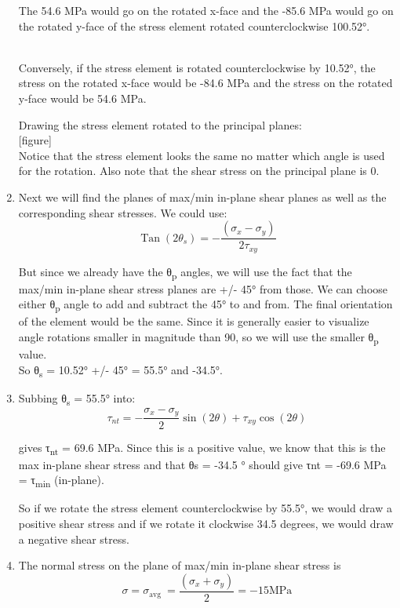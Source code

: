 \documentclass[
  letterpaper,
  DIV=11,
  numbers=noendperiod]{scrreprt}
\begin{document}
\begin{tcolorbox}
\begin{tcolorbox}
\begin{enumerate}
  The 54.6 MPa would go on the rotated x-face and the -85.6 MPa would go
  on the rotated y-face of the stress element rotated counterclockwise
  100.52°.\\
  \strut \\
  Conversely, if the stress element is rotated counterclockwise by
  10.52°, the stress on the rotated x-face would be -84.6 MPa and the
  stress on the rotated y-face would be 54.6 MPa.

  Drawing the stress element rotated to the principal planes:\\
  {[}figure{]}\\
  Notice that the stress element looks the same no matter which angle is
  used for the rotation. Also note that the shear stress on the
  principal plane is 0.
\item
  Next we will find the planes of max/min in-plane shear planes as well
  as the corresponding shear stresses. We could use:\\
  \[
  \operatorname{Tan}\left(2 \theta_s\right)=-\frac{\left(\sigma_x-\sigma_y\right)}{2 \tau_{x y}}
  \]

  But since we already have the θ\textsubscript{p} angles, we will use
  the fact that the max/min in-plane shear stress planes are +/- 45°
  from those. We can choose either θ\textsubscript{p} angle to add and
  subtract the 45° to and from. The final orientation of the element
  would be the same. Since it is generally easier to visualize angle
  rotations smaller in magnitude than 90, so we will use the smaller
  θ\textsubscript{p} value.\\
  So θ\textsubscript{s} = 10.52° +/- 45° = 55.5° and -34.5°.
\item
  Subbing θ\textsubscript{s} = 55.5° into:\\
  \[
  \tau_{n t}=-\frac{\sigma_x-\sigma_y}{2} \sin (2 \theta)+\tau_{x y} \cos (2 \theta)
  \]

  gives τ\textsubscript{nt} = 69.6 MPa. Since this is a positive value,
  we know that this is the max in-plane shear stress and that θs = -34.5
  ° should give τnt = -69.6 MPa = τ\textsubscript{min} (in-plane).

  So if we rotate the stress element counterclockwise by 55.5°, we would
  draw a positive shear stress and if we rotate it clockwise 34.5
  degrees, we would draw a negative shear stress.
\item
  The normal stress on the plane of max/min in-plane shear stress is\\
  \[
  \sigma=\sigma_{\text {avg }}=\frac{\left(\sigma_x+\sigma_y\right)}{2}=-15 \mathrm{MPa}
  \]
\end{enumerate}


\end{tcolorbox}
\end{tcolorbox}
\end{document}
